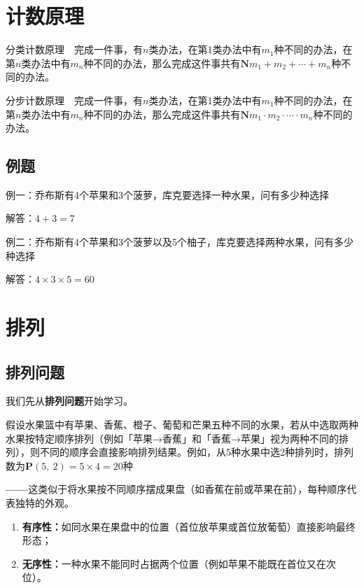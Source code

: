 \section{\textbf{计数原理}}

{\large 分类计数原理}~~完成一件事，有$n$类办法，在第1类办法中有$m_1$种不同的办法，在第$n$类办法中有$m_n$种不同的办法，那么完成这件事共有$\mathbf{N}m_{1}+m_{2}+\cdots{}+m_{n}$种不同的办法。

{\large 分步计数原理}~~完成一件事，有$n$类办法，在第1类办法中有$m_1$种不同的办法，在第$n$类办法中有$m_n$种不同的办法，那么完成这件事共有$\mathbf{N}m_{1}\cdot{}m_{2}\cdot{}\cdots{}\cdot{}m_{n}$种不同的办法。

\subsection{例题}

{\color{blue} 例一：}乔布斯有4个苹果和3个菠萝，库克要选择一种水果，问有多少种选择

{\color{blue} 解答：}$4+3=7$

{\color{blue} 例二：}乔布斯有4个苹果和3个菠萝以及5个柚子，库克要选择两种水果，问有多少种选择

{\color{blue} 解答：}$4\times{}3\times{}5=60$

\section{\textbf{排列}}

\subsection{排列问题}

我们先从\textbf{排列问题}开始学习。

假设水果篮中有苹果、香蕉、橙子、葡萄和芒果五种不同的水果，若从中选取两种水果按特定顺序排列（例如「苹果→香蕉」和「香蕉→苹果」视为两种不同的排列），则不同的顺序会直接影响排列结果。例如，从5种水果中选2种排列时，排列数为$\textbf{P}(5,~2) = 5 \times 4 = 20$种

\textbf{——}这类似于将水果按不同顺序摆成果盘（如香蕉在前或苹果在前），每种顺序代表独特的外观。

\begin{enumerate}
    \item \textbf{有序性：}如同水果在果盘中的位置（首位放苹果或首位放葡萄）直接影响最终形态；
    \item \textbf{无序性：}一种水果不能同时占据两个位置（例如苹果不能既在首位又在次位）。
\end{enumerate}

